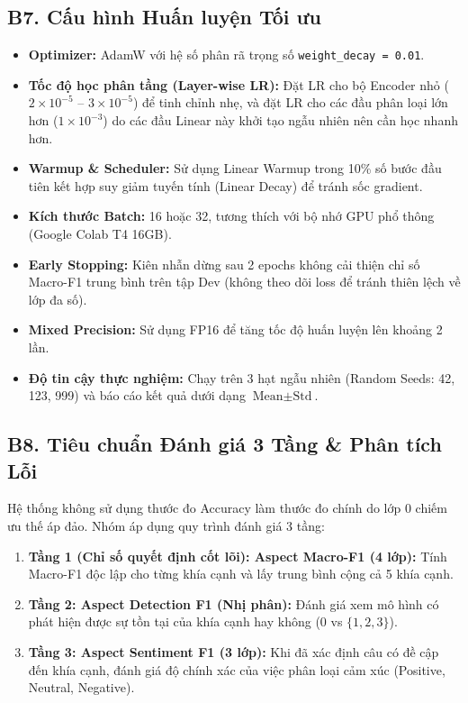 \documentclass[11pt,a4paper]{article}
\begin{document}
\subsection*{B7. Cấu hình Huấn luyện Tối ưu}
\begin{itemize}
    \item \textbf{Optimizer:} AdamW với hệ số phân rã trọng số \texttt{weight\_decay = 0.01}.
    \item \textbf{Tốc độ học phân tầng (Layer-wise LR):} Đặt LR cho bộ Encoder nhỏ ($2\times 10^{-5}$ -- $3\times 10^{-5}$) để tinh chỉnh nhẹ, và đặt LR cho các đầu phân loại lớn hơn ($1\times 10^{-3}$) do các đầu Linear này khởi tạo ngẫu nhiên nên cần học nhanh hơn.
    \item \textbf{Warmup \& Scheduler:} Sử dụng Linear Warmup trong 10\% số bước đầu tiên kết hợp suy giảm tuyến tính (Linear Decay) để tránh sốc gradient.
    \item \textbf{Kích thước Batch:} 16 hoặc 32, tương thích với bộ nhớ GPU phổ thông (Google Colab T4 16GB).
    \item \textbf{Early Stopping:} Kiên nhẫn dừng sau 2 epochs không cải thiện chỉ số Macro-F1 trung bình trên tập Dev (không theo dõi loss để tránh thiên lệch về lớp đa số).
    \item \textbf{Mixed Precision:} Sử dụng FP16 để tăng tốc độ huấn luyện lên khoảng 2 lần.
    \item \textbf{Độ tin cậy thực nghiệm:} Chạy trên 3 hạt ngẫu nhiên (Random Seeds: 42, 123, 999) và báo cáo kết quả dưới dạng $\text{Mean} \pm \text{Std}$.
\end{itemize}

\subsection*{B8. Tiêu chuẩn Đánh giá 3 Tầng \& Phân tích Lỗi}
Hệ thống không sử dụng thước đo Accuracy làm thước đo chính do lớp 0 chiếm ưu thế áp đảo. Nhóm áp dụng quy trình đánh giá 3 tầng:
\begin{enumerate}
    \item \textbf{Tầng 1 (Chỉ số quyết định cốt lõi): Aspect Macro-F1 (4 lớp):} Tính Macro-F1 độc lập cho từng khía cạnh và lấy trung bình cộng cả 5 khía cạnh.
    \item \textbf{Tầng 2: Aspect Detection F1 (Nhị phân):} Đánh giá xem mô hình có phát hiện được sự tồn tại của khía cạnh hay không ($0$ vs $\{1, 2, 3\}$).
    \item \textbf{Tầng 3: Aspect Sentiment F1 (3 lớp):} Khi đã xác định câu có đề cập đến khía cạnh, đánh giá độ chính xác của việc phân loại cảm xúc (Positive, Neutral, Negative).
\end{enumerate}
\end{document}
